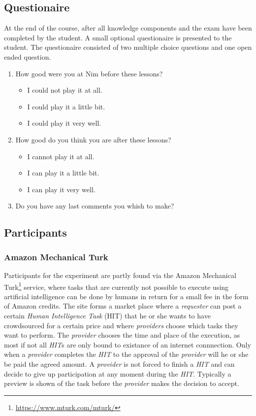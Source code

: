 \subsection{Questionaire}
\label{sec:setup_questionaire}
At the end of the course, after all knowledge components and the exam have been
completed by the student. A small optional questionaire is presented to the
student. The questionaire consisted of two multiple choice questions and one
open ended question.
\begin{enumerate}
	\item How good were you at Nim before these lessons?
		\begin{itemize}
			\item I could not play it at all.
			\item I could play it a little bit.
			\item I could play it very well.
		\end{itemize}
	\item How good do you think you are after these lessons?
		\begin{itemize}
			\item I cannot play it at all.
			\item I can play it a little bit.
			\item I can play it very well.
		\end{itemize}
	\item Do you have any last comments you whish to make?
\end{enumerate}
\subsection{Participants}
\label{sec:setup_dissemination}
\subsubsection{Amazon Mechanical Turk}
Participants for the experiment are partly found via the Amazon Mechanical
Turk\footnote{\url{https://www.mturk.com/mturk/}} service, where tasks that are
currently not possible to execute using artificial intelligence can be done by
humans in return for a small fee in the form of Amazon credits. The site forms
a market place where a \emph{requester} can post a certain \emph{Human
Intelligence Task} (HIT) that he or she wants to have crowdsourced for a
certain price and where \emph{providers} choose which tasks they want to perform.
The \emph{provider} chooses the time and place of the execution, as most if not
all \emph{HIT}s are only bound to existance of an internet connnection. Only
when a \emph{provider} completes the \emph{HIT} to the approval of the
\emph{provider} will he or she be paid the agreed amount. A \emph{provider} is
not forced to finish a \emph{HIT} and can decide to give up participation at
any moment during the \emph{HIT}. Typically a preview is shown of the task
before the \emph{provider} makes the decision to accept.


